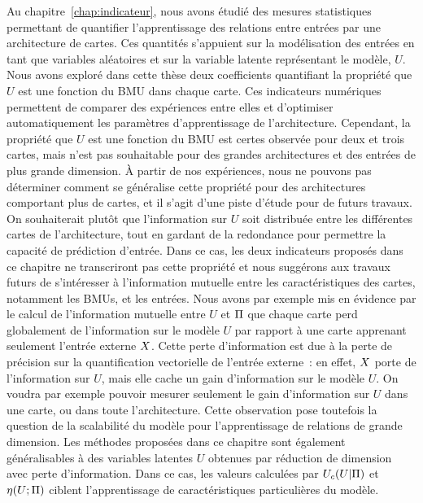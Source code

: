 Au chapitre~\ref{chap:indicateur}, nous avons étudié des mesures statistiques permettant de quantifier l'apprentissage des relations entre entrées par une architecture de cartes.
Ces quantités s'appuient sur la modélisation des entrées en tant que variables aléatoires et sur la variable latente représentant le modèle, $U$.
Nous avons exploré dans cette thèse deux coefficients quantifiant la propriété que $U$ est une fonction du BMU dans chaque carte. Ces indicateurs numériques permettent de comparer des expériences entre elles et d'optimiser automatiquement les paramètres d'apprentissage de l'architecture.
Cependant, la propriété que $U$ est une fonction du BMU est certes observée pour deux et trois cartes, mais n'est pas souhaitable pour des grandes architectures et des entrées de plus grande dimension. \`A partir de nos expériences, nous ne pouvons pas déterminer comment se généralise cette propriété pour des architectures comportant plus de cartes, et il s'agit d'une piste d'étude pour de futurs travaux.
On souhaiterait plutôt que l'information sur $U$ soit distribuée entre les différentes cartes de l'architecture, tout en gardant de la redondance pour permettre la capacité de prédiction d'entrée.
Dans ce cas, les deux indicateurs proposés dans ce chapitre ne transcriront pas cette propriété et nous suggérons aux travaux futurs de s'intéresser à l'information mutuelle entre les caractéristiques des cartes, notamment les BMUs, et les entrées. Nous avons par exemple mis en évidence par le calcul de l'information mutuelle entre $U$ et $\Pi$ que chaque carte perd globalement de l'information sur le modèle $U$ par rapport à une carte apprenant seulement l'entrée externe $X$.
Cette perte d'information est due à la perte de précision sur la quantification vectorielle de l'entrée externe~: en effet, $X$ porte de l'information sur $U$, mais elle cache un gain d'information sur le modèle $U$.
On voudra par exemple pouvoir mesurer seulement le gain d'information sur $U$ dans une carte, ou dans toute l'architecture. Cette observation pose toutefois la question de la scalabilité du modèle pour l'apprentissage de relations de grande dimension.
Les méthodes proposées dans ce chapitre sont également généralisables à des variables latentes  $U$ obtenues par réduction de dimension avec perte d'information. 
Dans ce cas, les valeurs calculées par $U_c(U |\Pi)$ et $\eta(U;\Pi)$ ciblent l'apprentissage de caractéristiques particulières du modèle.

